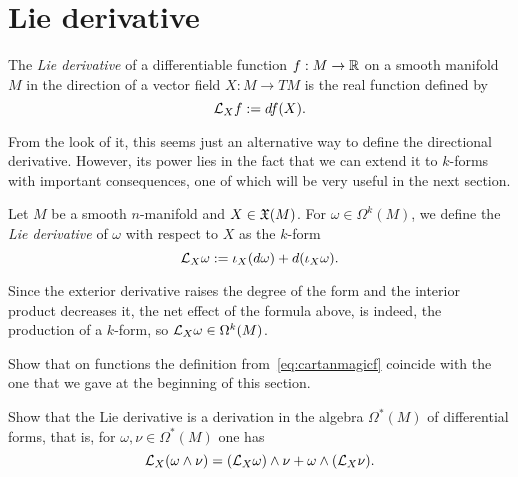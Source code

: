 \section{Lie derivative}

\begin{definition}
	The \emph{Lie derivative} of a differentiable function $f:M\to\mathbb{R}$ on a smooth manifold $M$ in the direction of a vector field $X:M\to TM$ is the real function defined by
	\begin{equation}
		\mathcal{L}_X f := df(X).
	\end{equation}
\end{definition}

From the look of it, this seems just an alternative way to define the directional derivative.
However, its power lies in the fact that we can extend it to $k$-forms with important consequences, one of which will be very useful in the next section.

\begin{definition}
	Let $M$ be a smooth $n$-manifold and $X\in\mathfrak{X}(M)$.
	For $\omega\in\Omega^k(M)$, we define the \emph{Lie derivative} of $\omega$ with respect to $X$ as the $k$-form
	\begin{equation}\label{eq:cartanmagicf}
		\mathcal{L}_X\omega := \iota_X (d\omega) + d(\iota_X\omega).
	\end{equation}
\end{definition}

Since the exterior derivative raises the degree of the form and the interior product decreases it, the net effect of the formula above, is indeed, the production of a $k$-form, so $\mathcal{L}_X\omega \in \Omega^k(M)$.

\begin{exercise}
	Show that on functions the definition from~\eqref{eq:cartanmagicf} coincide with the one that we gave at the beginning of this section.
\end{exercise}

\begin{exercise}\label{exe:liederandwedge}
	Show that the Lie derivative is a derivation in the algebra $\Omega^*(M)$ of differential forms, that is, for $\omega,\nu\in\Omega^*(M)$ one has
	\begin{equation}
		\mathcal{L}_X(\omega\wedge\nu) = (\mathcal{L}_X\omega)\wedge\nu + \omega\wedge(\mathcal{L}_X \nu).
	\end{equation}
\end{exercise}

